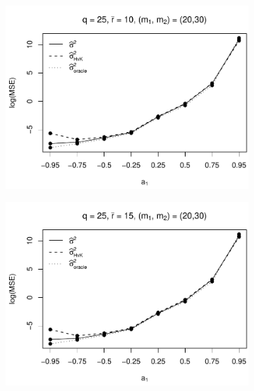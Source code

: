 \begin{figure}[p]
\begin{subfigure}[b]{0.45\textwidth}
\includegraphics[width=\textwidth]{Plots/Robustness/MSE_lrv_T=500_slope=1_(q,r,M1,M2)=(25,10,20,30).pdf}
\end{subfigure}
\hspace{0.25cm}
\begin{subfigure}[b]{0.45\textwidth}
\includegraphics[width=\textwidth]{Plots/Robustness/MSE_lrv_T=500_slope=1_(q,r,M1,M2)=(25,15,20,30).pdf}
\end{subfigure}


\end{figure}
